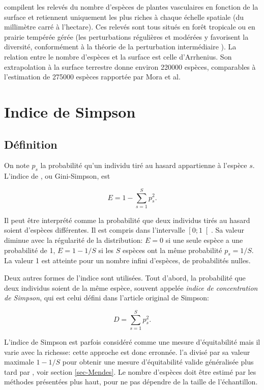 \documentclass[
  11pt,
  french,
  a4paper,
  extrafontsizes,onecolumn,openright
  ]{memoir}
\newlength{\rf}
\begin{document}
\textcite{Wilson2012} compilent les relevés du nombre d'espèces de plantes vasculaires en fonction de la surface et retiennent uniquement les plus riches à chaque échelle spatiale (du millimètre carré à l'hectare).
Ces relevés sont tous situés en forêt tropicale ou en prairie tempérée gérée (les perturbations régulières et modérées y favorisent la diversité, conformément à la théorie de la perturbation intermédiaire \autocite{Connell1978}).
La relation entre le nombre d'espèces et la surface est celle d'Arrhenius.
Son extrapolation à la surface terrestre donne environ 220000 espèces, comparables à l'estimation de 275000 espèces rapportée par Mora et al.

\section{Indice de Simpson}\label{indice-de-simpson}

\subsection{Définition}\label{duxe9finition}

On note \(p_s\) la probabilité qu'un individu tiré au hasard appartienne à l'espèce \(s\).
L'indice de \textcite{Simpson1949}, ou Gini-Simpson, est

\begin{equation}
  \label{eq:SimpsonE}
  E =1-\sum^{S}_{s=1}{p^2_s}.
\end{equation}

Il peut être interprété comme la probabilité que deux individus tirés au hasard soient d'espèces différentes.
Il est compris dans l'intervalle \(\left[0;1\right[\).
Sa valeur diminue avec la régularité de la distribution: \(E=0\) si une seule espèce a une probabilité de 1, \(E=1-{1}/{S}\) si les \(S\) espèces ont la même probabilité \(p_s={1}/{S}\).
La valeur 1 est atteinte pour un nombre infini d'espèces, de probabilités nulles.

Deux autres formes de l'indice sont utilisées.
Tout d'abord, la probabilité que deux individus soient de la même espèce, souvent appelée \emph{indice de concentration de Simpson}, qui est celui défini dans l'article original de Simpson:

\begin{equation}
  \label{eq:SimpsonD}
  D =\sum^{S}_{s=1}{p^2_s}.
\end{equation}

L'indice de Simpson est parfois considéré comme une mesure d'équitabilité \autocite{Olszewski2004} mais il varie avec la richesse: cette approche est donc erronnée.
\textcite{Hurlbert1971} l'a divisé par sa valeur maximale \(1-{1}/{S}\) pour obtenir une mesure d'équitabilité valide généralisée plus tard par \textcite{Mendes2008}, voir section \ref{sec-Mendes}.
Le nombre d'espèces doit être estimé par les méthodes présentées plus haut, pour ne pas dépendre de la taille de l'échantillon.
\end{document}
